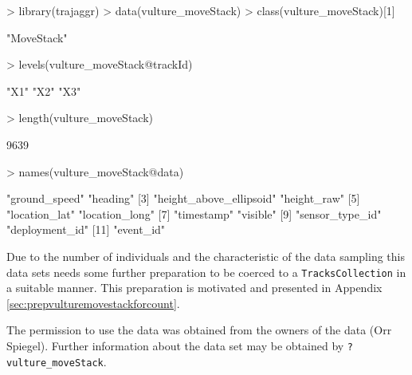 \documentclass[12pt, oneside, a4paper]{scrbook}
\let\code=\texttt
\begin{document}


\begin{small}
\begin{Schunk}
\begin{Sinput}
> library(trajaggr)
> data(vulture_moveStack)
> class(vulture_moveStack)[1]
\end{Sinput}
\begin{Soutput}
[1] "MoveStack"
\end{Soutput}
\begin{Sinput}
> levels(vulture_moveStack@trackId)
\end{Sinput}
\begin{Soutput}
[1] "X1" "X2" "X3"
\end{Soutput}
\begin{Sinput}
> length(vulture_moveStack)
\end{Sinput}
\begin{Soutput}
[1] 9639
\end{Soutput}
\begin{Sinput}
> names(vulture_moveStack@data)
\end{Sinput}
\begin{Soutput}
 [1] "ground_speed"           "heading"               
 [3] "height_above_ellipsoid" "height_raw"            
 [5] "location_lat"           "location_long"         
 [7] "timestamp"              "visible"               
 [9] "sensor_type_id"         "deployment_id"         
[11] "event_id"              
\end{Soutput}
\end{Schunk}
\end{small}

\par\medskip

Due to the number of individuals and the characteristic of the data sampling this data sets needs some further preparation to be coerced to a \code{TracksCollection} in a suitable manner. This preparation is motivated and presented in Appendix \ref{sec:prepvulturemovestackforcount}.
\par\medskip

The permission to use the data was obtained from the owners of the data (Orr Spiegel).
Further information about the data set may be obtained by \code{?vulture\_moveStack}.
\par\medskip
\end{document}
